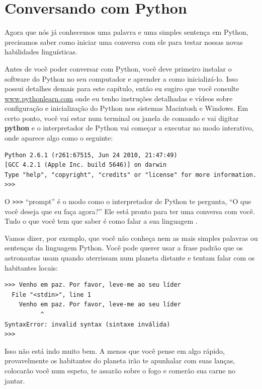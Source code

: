 \section{Conversando com Python} %

Agora que nós já conhecemos uma palavra e uma simples sentença em Python, precisamos saber como iniciar uma conversa com ele para testar nossas novas habilidades linguísticas. 

Antes de você poder conversar com Python, você deve primeiro instalar o software do Python no seu computador e aprender a como inicializá-lo. Isso possui detalhes demais para este capítulo, então eu sugiro que você consulte \url{www.pythonlearn.com} onde eu tenho instruções detalhadas e vídeos sobre configuração e inicialização do Python nos sistemas Macintosh e Windows. Em certo ponto, você vai estar num terminal ou janela de comando e vai digitar {\bf python} e o interpretador de Python vai começar a executar no modo interativo, onde aparece algo como o seguinte:



\begin{verbatim}
Python 2.6.1 (r261:67515, Jun 24 2010, 21:47:49) 
[GCC 4.2.1 (Apple Inc. build 5646)] on darwin
Type "help", "copyright", "credits" or "license" for more information.
>>> 
\end{verbatim}

%
O {\tt >>>} ``prompt'' é o modo como o interpretador de Python te pergunta, ``O que você deseja que eu faça agora?'' Ele está pronto para ter uma conversa com você. Tudo o que você tem que saber é como falar a sua linguagem .

Vamos dizer, por exemplo, que você não conheça nem as mais simples palavras ou sentenças da linguagem Python. Você pode querer usar a frase padrão que os astronautas usam quando aterrissam num planeta distante e tentam falar com os habitantes locais:


\begin{verbatim}
>>> Venho em paz. Por favor, leve-me ao seu líder
  File "<stdin>", line 1
    Venho em paz. Por favor, leve-me ao seu líder
          ^
SyntaxError: invalid syntax (sintaxe inválida)
>>> 
\end{verbatim}

%
Isso não está indo muito bem. A menos que você pense em algo rápido, provavelmente os habitantes do planeta irão te apunhalar com suas lanças, colocarão você num espeto, te assarão sobre o fogo e comerão sua carne no jantar.


